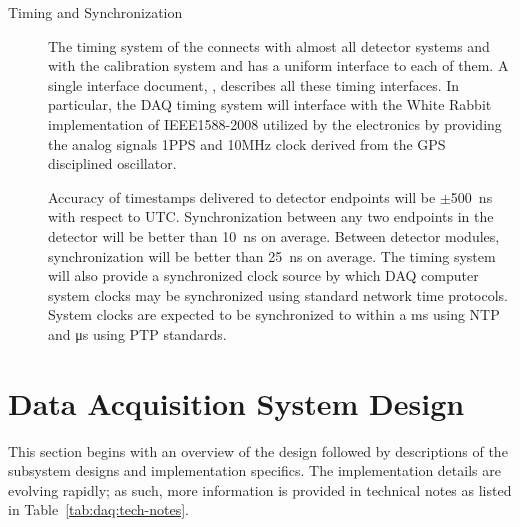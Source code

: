 \begin{description}
\item[Timing and Synchronization] The timing system of the 
   connects with almost all detector systems and with the calibration
  system and has a uniform interface to each of them. 
  A single interface document, , describes all these timing
  interfaces. 
  In particular, the DAQ timing system will interface with the White Rabbit
  implementation of IEEE1588-2008 utilized by the  electronics by providing the analog signals
1PPS and  10MHz clock derived from the GPS disciplined oscillator.

  Accuracy of timestamps delivered to detector endpoints will be
  $\pm$\SI{500}{\nano\second} with respect to UTC.
  Synchronization between any two endpoints in the detector will be better than
  \SI{10}{\nano\second} on average.
  Between detector modules, synchronization will be better than
  \SI{25}{\nano\second} on average.
  The timing system will also provide a synchronized clock source by which DAQ
  computer system clocks may be synchronized using standard network time
  protocols.
  System clocks are expected to be synchronized to within a ms using NTP and
  \si{\micro\second} using PTP standards.

\end{description}

\section{Data Acquisition System Design}
\label{sec:daq:design}

This section begins with an overview of the  design followed by
descriptions of the subsystem designs and implementation specifics.
The implementation details are evolving rapidly; as such, more information is
provided in technical notes as listed in Table~\ref{tab:daq:tech-notes}. 

